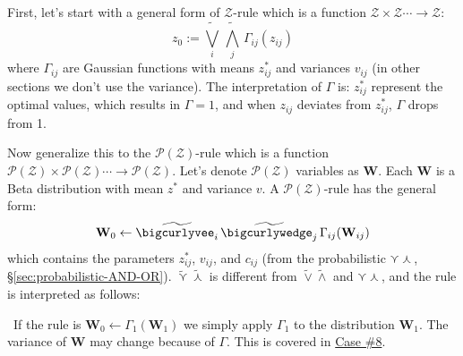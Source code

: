 First, let's start with a general form of $\mathcal{Z}$-rule which is a function $\mathcal{Z} \times \mathcal{Z} \cdots \rightarrow \mathcal{Z}$:\\
$$ z_0 := \widetilde{\bigvee_i}\, \widetilde{\bigwedge_j}\, \Gamma_{ij}(z_{ij}) $$
where $\Gamma_{ij}$ are Gaussian functions with means $z^*_{ij}$ and variances $v_{ij}$ (in other sections we don't use the variance).  The interpretation of $\Gamma$ is:  $z^*_{ij}$ represent the optimal values, which results in $\Gamma = 1$, and when $z_{ij}$ deviates from $z^*_{ij}$, $\Gamma$ drops from 1.

Now generalize this to the $\mathcal{P}(\mathcal{Z})$-rule which is a function $\mathcal{P}(\mathcal{Z}) \times \mathcal{P}(\mathcal{Z}) \cdots \rightarrow \mathcal{P}(\mathcal{Z})$.  Let's denote $\mathcal{P}(\mathcal{Z})$ variables as $\mathbf{W}$.  Each $\mathbf{W}$ is a Beta distribution with mean $z^*$ and variance $v$.  A $\mathcal{P}(\mathcal{Z})$-rule has the general form:\\
\begin{equation}
\mathbf{W}_0 \leftarrow \widetilde{\bigcurlyvee_i} \, \widetilde{\bigcurlywedge_j}\, \Gamma_{ij}(\mathbf{W}_{ij})
\end{equation}
which contains the parameters $z^*_{ij}$, $v_{ij}$, and $c_{ij}$ (from the probabilistic $\curlyvee \curlywedge$, \S\ref{sec:probabilistic-AND-OR}).  $\widetilde{\curlyvee} \widetilde{\curlywedge}$ is different from $\widetilde{\vee} \widetilde{\wedge}$ and $\curlyvee \curlywedge$, and the rule is interpreted as follows:

\textbullet \, If the rule is $ \mathbf{W}_0 \leftarrow \Gamma_1(\mathbf{W}_1) $ we simply apply $\Gamma_1$ to the distribution $\mathbf{W}_1$.  The variance of $\mathbf{W}$ may change because of $\Gamma$.  This is covered in \hyperref[case8]{Case \#8}.


